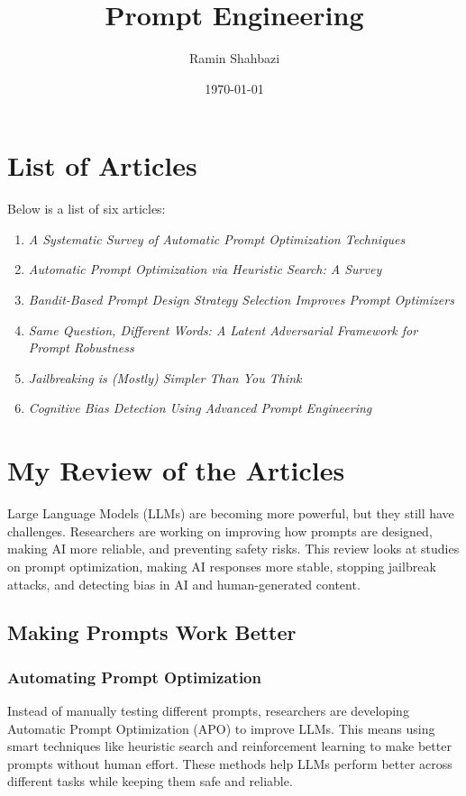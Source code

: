 \documentclass[a4paper,12pt]{article}
\title{Prompt Engineering}
\author{Ramin Shahbazi}
\date{\today}
\begin{document}
\maketitle

\section{List of Articles}
Below is a list of six articles:

\begin{enumerate}
    \item \textit{A Systematic Survey of Automatic Prompt Optimization Techniques}
    \item \textit{Automatic Prompt Optimization via Heuristic Search: A Survey}
    \item \textit{Bandit-Based Prompt Design Strategy Selection Improves Prompt Optimizers}
    \item \textit{Same Question, Different Words: A Latent Adversarial Framework for Prompt Robustness}
    \item \textit{Jailbreaking is (Mostly) Simpler Than You Think}
    \item \textit{Cognitive Bias Detection Using Advanced Prompt Engineering}

\end{enumerate}

\newpage

\section{My Review of the Articles}

Large Language Models (LLMs) are becoming more powerful, but they still have challenges. Researchers are working on improving how prompts are designed, making AI more reliable, and preventing safety risks. This review looks at studies on prompt optimization, making AI responses more stable, stopping jailbreak attacks, and detecting bias in AI and human-generated content.

\subsection{Making Prompts Work Better}
\subsubsection{Automating Prompt Optimization}
Instead of manually testing different prompts, researchers are developing Automatic Prompt Optimization (APO) to improve LLMs. This means using smart techniques like heuristic search and reinforcement learning to make better prompts without human effort. These methods help LLMs perform better across different tasks while keeping them safe and reliable.
\end{document}
